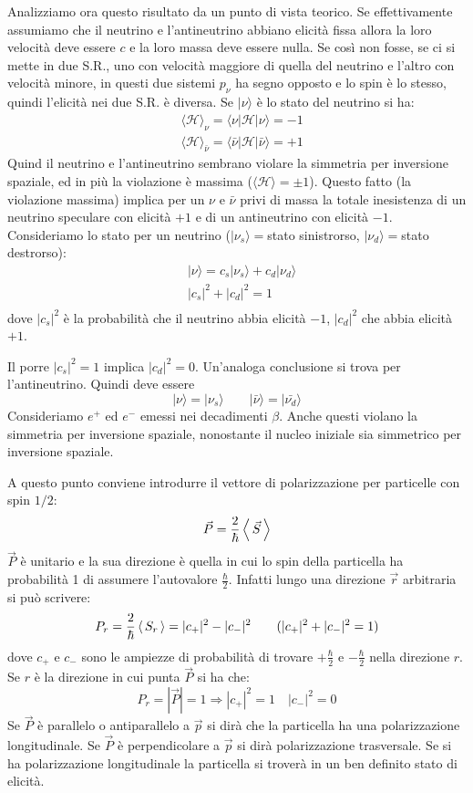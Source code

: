 Analizziamo ora questo risultato da un punto di vista teorico. Se 
effettivamente assumiamo che il neutrino e l'antineutrino abbiano elicità 
fissa allora la loro velocità deve essere $c$
e la loro  massa deve essere nulla. Se così non fosse, se ci si mette in due 
S.R., uno con velocità maggiore di quella del neutrino e l'altro con velocità 
minore, in questi due sistemi $p_{\nu}$
ha segno opposto e lo spin è lo stesso, quindi l'elicità nei due S.R. è 
diversa. Se $|\nu\rangle$ è lo stato del neutrino si ha:
\begin{align*}
&\langle\mathcal{H}\rangle_{\nu}=\langle\nu|\mathcal{H}|\nu\rangle=-1\\
&\langle\mathcal{H}\rangle_{\bar{\nu}}=\langle\bar{\nu}|\mathcal{H}|
\bar{\nu}\rangle=+1
\end{align*}
Quind il neutrino e l'antineutrino sembrano violare la simmetria per inversione 
spaziale, ed in più la violazione è massima 
($\langle\mathcal{H}\rangle=\pm1$).
Questo fatto (la violazione massima) implica per un $\nu$ e $\bar{\nu}$ privi 
di massa la totale inesistenza di un neutrino speculare con elicità $+1$
e di un antineutrino con elicità $-1$. Consideriamo lo stato per un neutrino 
($|\nu_s\rangle=$stato sinistrorso, $|\nu_d\rangle=$stato destrorso):
\begin{align*}
&|\nu\rangle=c_s|\nu_s\rangle+c_d|\nu_d\rangle\\
&|c_s|^2+|c_d|^2=1\\
\end{align*}
dove $|c_s|^2$ è la probabilità che il neutrino abbia elicità $-1$, 
$|c_d|^2$ che abbia elicità $+1$.

Il porre $|c_s|^2=1$ implica $|c_d|^2=0$. Un'analoga conclusione si trova per 
l'antineutrino. Quindi deve essere
\[
|\nu\rangle=|\nu_s\rangle\qquad |\bar{\nu}\rangle=|\bar{\nu_d}\rangle
\]
Consideriamo $e^+$ ed $e^-$ emessi nei decadimenti $\beta$. Anche questi violano
la simmetria per inversione spaziale, nonostante il nucleo iniziale sia 
simmetrico per inversione
spaziale.

A questo punto conviene introdurre il vettore di polarizzazione per particelle 
con spin $1/2$:
\[
  \vec{P}=\frac{2}{\hbar}\left\langle\, \vec{S} \,\right\rangle
\]
$\vec{P}$ è unitario e la sua direzione è quella in cui lo spin della 
particella ha probabilità 1 di assumere l'autovalore $\frac{\hbar}{2}$. 
Infatti lungo una direzione $\vec{r}$ arbitraria
si può scrivere:
\[
  P_r=\frac{2}{\hbar}\left\langle\, S_r \,\right\rangle=|c_+|^2-|c_-|^2\qquad (|c_+|^2+|c_-|^2=1)
\]
dove $c_+$ e $c_-$ sono le ampiezze di probabilità di trovare 
$+\frac{\hbar}{2}$ e $-\frac{\hbar}{2}$ nella direzione $r$. Se $r$ è la 
direzione in cui punta $\vec{P}$ si ha che:
\[
P_r=|\vec{P}|=1\Rightarrow|c_+|^2=1\quad|c_-|^2=0
\]
Se $\vec{P}$ è parallelo o antiparallelo a $\vec{p}$ si dirà che la 
particella ha una polarizzazione longitudinale. Se $\vec{P}$ è perpendicolare 
a $\vec{p}$ si dirà
polarizzazione trasversale. Se si ha polarizzazione longitudinale la particella 
si troverà in un ben definito stato di elicità.
